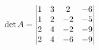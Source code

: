 \documentclass{article}
\begin{document}
$$\det A =
\begin{vmatrix}
1 & 3 & 2 & -6 \\ 
1 & 2 & -2 & -5 \\ 
2 & 4 & -2 & -9 \\ 
2 & 4 & -6 & -9  \notag
\end{vmatrix}
$$
\end{document}
